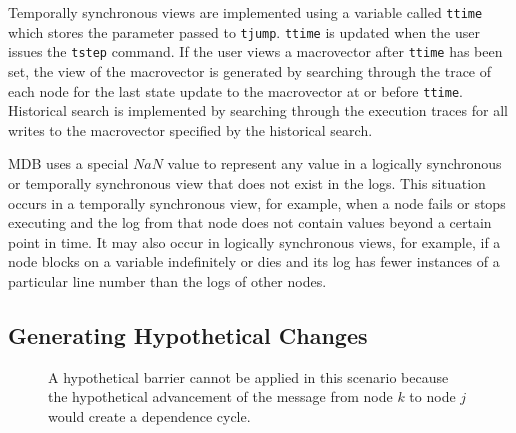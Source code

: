 Temporally synchronous views are implemented using a variable called {\tt ttime}
which stores the parameter passed to {\tt tjump}. {\tt ttime} is updated when
the user issues the {\tt tstep} command. If the user views a macrovector after
{\tt ttime} has been set, the view of the macrovector is generated by searching
through the trace of each node for the last state update to the macrovector at
or before {\tt ttime}. Historical search is implemented by searching through the
execution traces for all writes to the macrovector specified by the historical
search.

MDB uses a special $NaN$ value to represent any value in a logically synchronous
or temporally synchronous view that does not exist in the logs.  This situation
occurs in a temporally synchronous view, for example, when a node fails or stops
executing and the log from that node does not contain values beyond a certain
point in time.  It may also occur in logically synchronous views, for example,
if a node blocks on a variable indefinitely or dies and its log has fewer
instances of a particular line number than the logs of other nodes.

\subsection{Generating Hypothetical Changes} \label{genAlt}

\begin{figure}[t]
  \caption[Grandfather paradox]{A hypothetical barrier cannot be applied in this
  scenario because the hypothetical advancement of the message from node $k$ to
  node $j$ would create a dependence cycle.}
  \label{fig:grandfather}
\end{figure}

